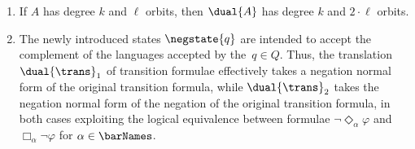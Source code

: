 \documentclass[10pt, final, conference, a4paper, twocolumn]{IEEEtran}
\begin{document}
\begin{rem}
  \begin{enumerate}%
  \item If $A$ has degree $k$ and
    $\ell$ orbits, then $\dual{A}$ has degree $k$ and
    $2 \cdot \ell$ orbits.
  \item The newly introduced states $\negstate{q}$ are intended to
    accept the complement of the languages accepted by the~$q \in Q$. Thus,
    the translation $\dual{\trans}_1$ of transition formulae
    effectively takes a negation normal form of the original
    transition formula, while $\dual{\trans}_2$ takes the negation
    normal form of the negation of the original transition formula, in
    both cases exploiting the logical equivalence between formulae
    $\neg\Diamond_\alpha \varphi$ and $\Box_\alpha \neg\varphi$ for
    $\alpha \in \barNames$.
  \end{enumerate}
\end{rem}
\end{document}
